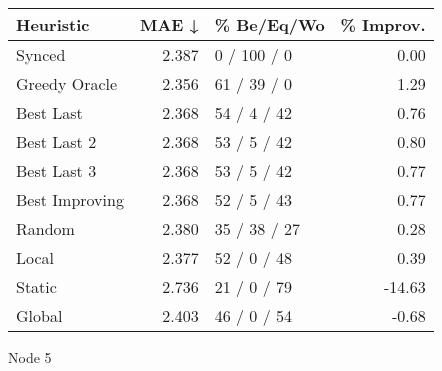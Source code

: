 \begin{tabular}{lrlr}
\toprule
\textbf{Heuristic} & \textbf{MAE ↓} & \textbf{\% Be/Eq/Wo} & \textbf{\% Improv.} \\
\midrule
            Synced &          2.387 &          0 / 100 / 0 &                0.00 \\
     Greedy Oracle &          2.356 &          61 / 39 / 0 &                1.29 \\
         Best Last &          2.368 &          54 / 4 / 42 &                0.76 \\
       Best Last 2 &          2.368 &          53 / 5 / 42 &                0.80 \\
       Best Last 3 &          2.368 &          53 / 5 / 42 &                0.77 \\
    Best Improving &          2.368 &          52 / 5 / 43 &                0.77 \\
            Random &          2.380 &         35 / 38 / 27 &                0.28 \\
             Local &          2.377 &          52 / 0 / 48 &                0.39 \\
            Static &          2.736 &          21 / 0 / 79 &              -14.63 \\
            Global &          2.403 &          46 / 0 / 54 &               -0.68 \\
\bottomrule
\end{tabular}
\caption{Node 5}
\label{tab:ds_iid_lr01_le1_bs2_5}
